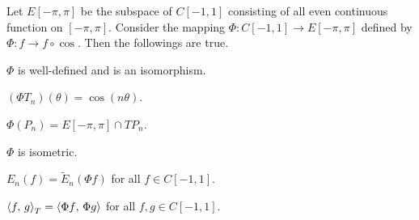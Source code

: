 \begin{proposition}\label{prop:chebyshev_isomorphism}
    Let $E[-\pi,\pi]$ be the subspace of $C[-1,1]$ consisting of 
    all even continuous function on $[-\pi,\pi]$. Consider the mapping 
    $\Phi:C[-1,1]\to E[-\pi,\pi]$ defined by $\Phi:f\to f\circ\cos$. 
    Then the followings are true. 
    \begin{thmenum}
        \item $\Phi$ is well-defined and is an isomorphism. 
        \item $(\Phi T_n)(\theta) = \cos(n\theta)$. 
        \item $\Phi(P_n) = E[-\pi,\pi]\cap TP_n$. 
        \item $\Phi$ is isometric. 
        \item $E_n(f) = \tilde{E}_n(\Phi f)$ for all $f\in C[-1,1]$.
        \item $\left\langle {f},\, {g} \right\rangle_T = \left\langle {\Phi f},\, {\Phi g} \right\rangle$ for all $f,g\in C[-1,1]$.
    \end{thmenum}
\end{proposition}
